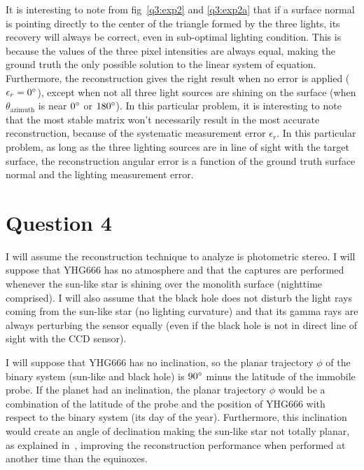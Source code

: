 \documentclass{report}
\begin{document}

It is interesting to note from fig~\ref{q3:exp2} and \ref{q3:exp2a} that if a surface normal is pointing directly to the center of the triangle formed by the three lights, its recovery will always be correct, even in sub-optimal lighting condition. This is because the values of the three pixel intensities are always equal, making the ground truth the only possible solution to the linear system of equation. Furthermore, the reconstruction gives the right result when no error is applied ($\epsilon_r = 0\degree$), except when not all three light sources are shining on the surface (when $\theta_{\text{azimuth}}$ is near $0\degree$ or $180\degree$). In this particular problem, it is interesting to note that the most stable matrix won't necessarily result in the most accurate reconstruction, because of the systematic measurement error $\epsilon_r$. In this particular problem, as long as the three lighting sources are in line of sight with the target surface, the reconstruction angular error is a function of the ground truth surface normal and the lighting measurement error.

\FloatBarrier
\section{Question 4}

I will assume the reconstruction technique to analyze is photometric stereo. I will suppose that YHG666 has no atmosphere and that the captures are performed whenever the sun-like star is shining over the monolith surface (nighttime comprised). I will also assume that the black hole does not disturb the light rays coming from the sun-like star (no lighting curvature) and that its gamma rays are always perturbing the sensor equally (even if the black hole is not in direct line of sight with the CCD sensor).

I will suppose that YHG666 has no inclination, so the planar trajectory $\phi$ of the binary system (sun-like and black hole) is $90\degree$ minus the latitude of the immobile probe. If the planet had an inclination, the planar trajectory $\phi$ would be a combination of the latitude of the probe and the position of YHG666 with respect to the binary system (its day of the year). Furthermore, this inclination would create an angle of declination making the sun-like star not totally planar, as explained in~\cite{shen-pg-14}, improving the reconstruction performance when performed at another time than the equinoxes.
\end{document}
